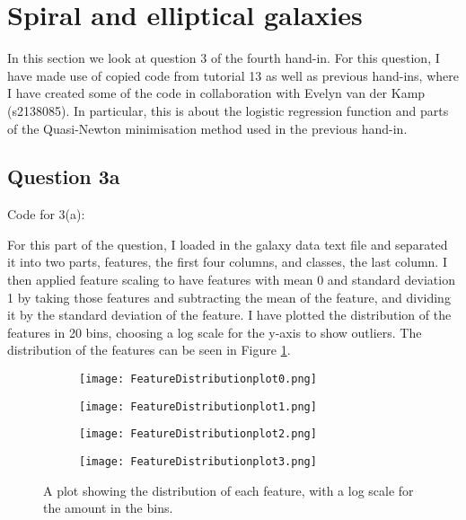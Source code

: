 \section{Spiral and elliptical galaxies}

In this section we look at question 3 of the fourth hand-in. 
For this question, I have made use of copied code from tutorial 13 as well as previous hand-ins, where I have created some of the code in collaboration with Evelyn van der Kamp (s2138085).
In particular, this is about the logistic regression function and parts of the Quasi-Newton minimisation method used in the previous hand-in.

\subsection{Question 3a}

Code for 3(a):


For this part of the question, I loaded in the galaxy data text file and separated it into two parts, features, the first four columns, and classes, the last column.
I then applied feature scaling to have features with mean 0 and standard deviation 1 by taking those features and subtracting the mean of the feature, and dividing it by the standard deviation of the feature.
I have plotted the distribution of the features in 20 bins, choosing a log scale for the y-axis to show outliers.
The distribution of the features can be seen in Figure \ref{fig:FD}.

\begin{figure}[ht!]
\begin{center}
        \begin{subfigure}{.49\textwidth}
      \centering
      \texttt{[image: FeatureDistributionplot0.png]}
    \end{subfigure}
    \begin{subfigure}{.49\textwidth}
      \centering
      \texttt{[image: FeatureDistributionplot1.png]}
    \end{subfigure}
    \begin{subfigure}{.49\textwidth}
      \centering
      \texttt{[image: FeatureDistributionplot2.png]}
    \end{subfigure}
    \begin{subfigure}{.49\textwidth}
      \centering
      \texttt{[image: FeatureDistributionplot3.png]}
    \end{subfigure}
    \caption{A plot showing the distribution of each feature, with a log scale for the amount in the bins.}
    \label{fig:FD}
\end{center}
\end{figure}


